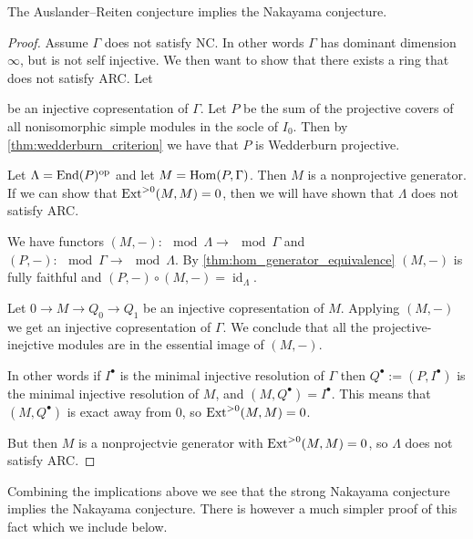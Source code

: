 \begin{theorem}
	The Auslander--Reiten conjecture implies the Nakayama conjecture.
	\begin{proof}
		Assume $\Gamma$ does not satisfy NC. In other words $\Gamma$ has dominant dimension $\infty$, but is not self injective. We then want to show that there exists a ring that does not satisfy ARC. Let
		\begin{center}
		\end{center}
		be an injective copresentation of $\Gamma$. Let $P$ be the sum of the projective covers of all nonisomorphic simple modules in the socle of $I_0$. Then by \cref{thm:wedderburn_criterion} we have that $P$ is Wedderburn projective.
		
		Let $\Lambda = \operatorname{End}(P)^{\operatorname{op}}$ and let $M = \operatorname{Hom}(P, \Gamma)$. Then $M$ is a nonprojective generator. If we can show that $\operatorname{Ext}^{>0}(M,M)=0$, then we will have shown that $\Lambda$ does not satisfy ARC.
		
		We have functors $(M,-)\colon\mod\Lambda \to \mod\Gamma$ and $(P,-)\colon\mod\Gamma \to \mod\Lambda$. By \cref{thm:hom_generator_equivalence} $(M, -)$ is fully faithful and $(P,-)\circ (M,-) = \operatorname{id}_{\Lambda}$.
		
		Let $0\to M \to Q_0 \to Q_1$ be an injective copresentation of $M$. Applying $(M,-)$ we get an injective copresentation of $\Gamma$. We conclude that all the projective-inejctive modules are in the essential image of $(M,-)$.
		
		In other words if $I^\bullet$ is the minimal injective resolution of $\Gamma$ then $Q^\bullet := (P, I^\bullet)$ is the minimal injective resolution of $M$, and $(M, Q^\bullet)=I^\bullet$. This means that $(M, Q^\bullet)$ is exact away from 0, so $\operatorname{Ext}^{>0}(M,M)=0$. 
		
		But then $M$ is a nonprojectvie generator with $\operatorname{Ext}^{>0}(M,M)=0$, so $\Lambda$ does not satisfy ARC.
	\end{proof}
\end{theorem}

Combining the implications above we see that the strong Nakayama conjecture implies the Nakayama conjecture. There is however a much simpler proof of this fact which we include below.


